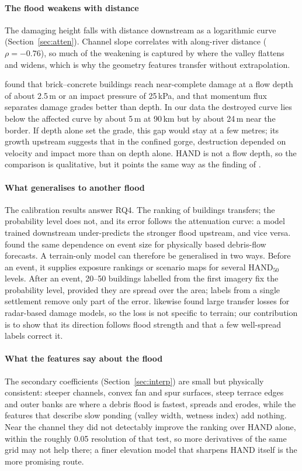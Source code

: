 \documentclass[journal,a4paper]{IEEEtran}
\begin{document}
\paragraph{The flood weakens with distance} The damaging height falls with distance downstream as a logarithmic curve (Section~\ref{sec:atten}). Channel slope correlates with along-river distance ($\rho = -0.76$), so much of the weakening is captured by where the valley flattens and widens, which is why the geometry features transfer without extrapolation.

\citet{wang2026} found that brick--concrete buildings reach near-complete damage at a flow depth of about 2.5\,m or an impact pressure of 25\,kPa, and that momentum flux separates damage grades better than depth. In our data the destroyed curve lies below the affected curve by about 5\,m at 90\,km but by about 24\,m near the border. If depth alone set the grade, this gap would stay at a few metres; its growth upstream suggests that in the confined gorge, destruction depended on velocity and impact more than on depth alone. HAND is not a flow depth, so the comparison is qualitative, but it points the same way as the finding of \citet{wang2026}.

\paragraph{What generalises to another flood} The calibration results answer RQ4. The ranking of buildings transfers; the probability level does not, and its error follows the attenuation curve: a model trained downstream under-predicts the stronger flood upstream, and vice versa. \citet{barnhart2024} found the same dependence on event size for physically based debris-flow forecasts. A terrain-only model can therefore be generalised in two ways. Before an event, it supplies exposure rankings or scenario maps for several HAND$_{50}$ levels. After an event, 20--50 buildings labelled from the first imagery fix the probability level, provided they are spread over the area; labels from a single settlement remove only part of the error. \citet{currie2026} likewise found large transfer losses for radar-based damage models, so the loss is not specific to terrain; our contribution is to show that its direction follows flood strength and that a few well-spread labels correct it.

\paragraph{What the features say about the flood} The secondary coefficients (Section~\ref{sec:interp}) are small but physically consistent: steeper channels, convex fan and spur surfaces, steep terrace edges and outer banks are where a debris flood is fastest, spreads and erodes, while the features that describe slow ponding (valley width, wetness index) add nothing. Near the channel they did not detectably improve the ranking over HAND alone, within the roughly 0.05 resolution of that test, so more derivatives of the same grid may not help there; a finer elevation model that sharpens HAND itself is the more promising route.
\end{document}

